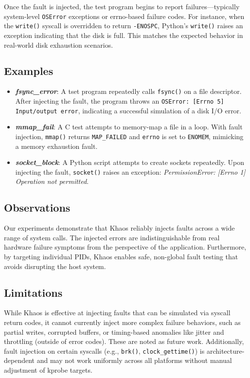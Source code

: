 Once the fault is injected, the test program begins to report failures—typically system-level \texttt{OSError} exceptions or errno-based failure codes. For instance, when the \texttt{write()} syscall is overridden to return \texttt{-ENOSPC}, Python’s \texttt{write()} raises an exception indicating that the disk is full. This matches the expected behavior in real-world disk exhaustion scenarios.

\subsection{Examples}

\begin{itemize}
    \item \textbf{\textit{fsync\_error}}: A tset program repeatedly calls \texttt{fsync()} on a file descriptor. After injecting the fault, the program throws an \texttt{OSError: [Errno 5] Input/output error}, indicating a successful simulation of a disk I/O error.
    
    \item \textbf{\textit{mmap\_fail}}: A C test attempts to memory-map a file in a loop. With fault injection, \texttt{mmap()} returns \texttt{MAP\_FAILED} and \texttt{errno} is set to \texttt{ENOMEM}, mimicking a memory exhaustion fault.
    
    \item \textbf{\textit{socket\_block}}: A Python script attempts to create sockets repeatedly. Upon injecting the fault, \texttt{socket()} raises an exception: \textit{PermissionError: [Errno 1] Operation not permitted}.
\end{itemize}

\subsection{Observations}

Our experiments demonstrate that Khaos reliably injects faults across a wide range of system calls. The injected errors are indistinguishable from real hardware failure symptoms from the perspective of the application. Furthermore, by targeting individual PIDs, Khaos enables safe, non-global fault testing that avoids disrupting the host system.

\subsection{Limitations}

While Khaos is effective at injecting faults that can be simulated via syscall return codes, it cannot currently inject more complex failure behaviors, such as partial writes, corrupted buffers, or timing-based anomalies like jitter and throttling (outside of error codes). These are noted as future work. Additionally, fault injection on certain syscalls (e.g., \texttt{brk()}, \texttt{clock\_gettime()}) is architecture-dependent and may not work uniformly across all platforms without manual adjustment of kprobe targets.

